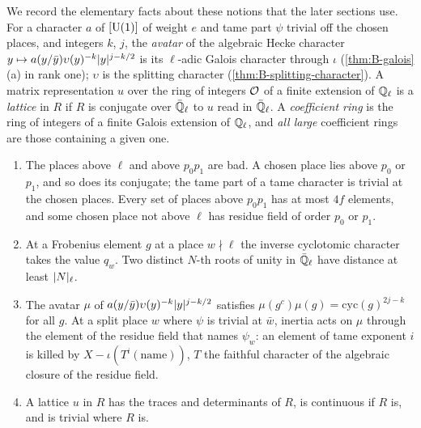 We record the elementary facts about these notions that the later sections use. For a character $a$ of $[\operatorname{U}(1)]$ of weight $e$ and tame part $\psi$ trivial off the chosen places, and integers $k$, $j$, the
\emph{avatar} of the algebraic Hecke character $y\mapsto a(y/\bar y)\upsilon(y)^{-k}\lvert y\rvert^{j-k/2}$ is its $\ell$-adic Galois character through $\iota$ (\cref{thm:B-galois}(a) in rank one); $\upsilon$ is the splitting character
(\cref{thm:B-splitting-character}). A matrix representation $u$ over the ring of integers $\mathcal{O}$ of a finite extension of $\mathbb{Q}_\ell$ is a \emph{lattice} in $R$ if $R$ is conjugate over $\bar{\mathbb{Q}}_\ell$ to $u$ read in $\bar{\mathbb{Q}}_\ell$. A
\emph{coefficient ring} is the ring of integers of a finite Galois extension of $\mathbb{Q}_\ell$, and \emph{all large} coefficient rings are those containing a given one.

\begin{lemma}\label{lem:avatars}
\begin{enumerate}[label=\textup{(\alph*)}]
\item The places above $\ell$ and above $p_0p_1$ are bad. A chosen place lies above $p_0$ or $p_1$, and so does its conjugate; the tame part of a tame character is trivial at the chosen places. Every set of places
above $p_0p_1$ has at most $4f$ elements, and some chosen place not above $\ell$ has residue field of order $p_0$ or $p_1$.
\item At a Frobenius element $g$ at a place $w\nmid\ell$ the inverse cyclotomic character takes the value $q_w$. Two distinct $N$-th roots of unity in $\bar{\mathbb{Q}}_\ell$ have distance at least $\lvert N\rvert_\ell$.
\item The avatar $\mu$ of $a(y/\bar y)\upsilon(y)^{-k}\lvert y\rvert^{j-k/2}$ satisfies $\mu(g^c)\mu(g)=\mathrm{cyc}(g)^{2j-k}$ for all $g$. At a split place $w$ where $\psi$ is trivial at $\bar w$, inertia acts on $\mu$ through the element of the
residue field that names $\psi_w$: an element of tame exponent $i$ is killed by $X-\iota(T^i(\text{name}))$, $T$ the faithful character of the algebraic closure of the residue field.
\item A lattice $u$ in $R$ has the traces and determinants of $R$, is continuous if $R$ is, and is trivial where $R$ is.
\end{enumerate}
\end{lemma}

